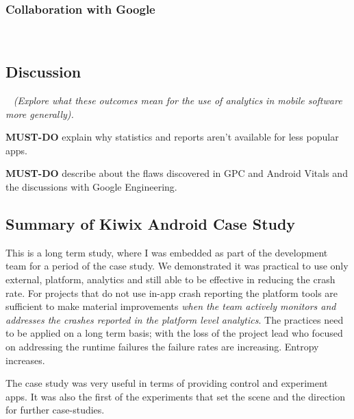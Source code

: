\subsubsection{Collaboration with Google}~\label{section-collaboration-with-google}





\subsection{Discussion}~\label{case-study-kiwix-discussion}
\textit{(Explore what these outcomes mean for the use of analytics in mobile software more generally).}

\textbf{MUST-DO} explain why statistics and reports aren't available for less popular apps.

\textbf{MUST-DO} describe about the flaws discovered in GPC and Android Vitals and the discussions with Google Engineering.



\subsection{Summary of Kiwix Android Case Study}

This is a long term study, where I was embedded as part of the development team for a period of the case study. We demonstrated it was practical to use only external, platform, analytics and still able to be effective in reducing the crash rate. For projects that do not use in-app crash reporting the platform tools are sufficient to make material improvements \emph{when the team actively monitors and addresses the crashes reported in the platform level analytics}. The practices need to be applied on a long term basis; with the loss of the project lead who focused on addressing the runtime failures the failure rates are increasing. Entropy increases.


The case study was very useful in terms of providing  control and experiment apps. It was also the first of the experiments that set the scene and the direction for further case-studies.

